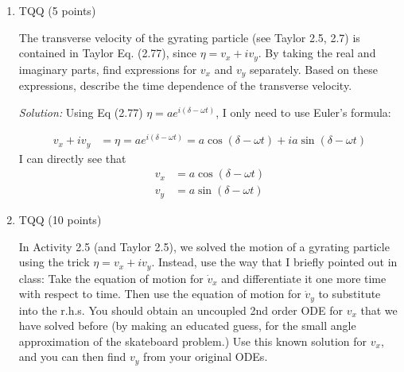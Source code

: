 \documentclass[12pt]{article}
\DeclareMathOperator{\sech}{sech}
\DeclareMathOperator{\arctanh}{arctanh}
\newcommand{\soln}[1] {\textit{Solution:} #1}
\begin{document}
\begin{enumerate}
\begin{enumerate}
                \soln{
                  $$1 - \tanh^2 z = 1 - \frac{\sinh^2 z}{\cosh^2 z} = \frac{\cosh^2 - \sinh^2}{\cosh^2} =\frac{1}{\cosh^z} = \sech^2 z$$
                }
          \item Show that $\int dx / (1-x^2) = \tanh^{-1} x$. ($\tanh^{-1}$ is also called $\arctanh$.)

                \soln{Again, I'm taking the derivative of the r.h.s. The derivative of the inverse of a function is one over the derivative of the function itself:

                  \begin{align*}
                    \frac{d}{dx}  \tanh^{-1} x & = \frac{1}{\tanh' (\tanh^{-1} x)} = \cosh^2  (\tanh^{-1} x) \\
                                               & = \frac{1}{1-\tanh^2 (\tanh^{-1} x)} = \frac{1}{1-x^2}
                  \end{align*}

                }

        \end{enumerate}


  \item TQQ (5 points)

        The transverse velocity of the gyrating particle (see Taylor 2.5, 2.7) is contained in Taylor Eq. (2.77), since $\eta = v_x + i v_y$. By taking the real and imaginary parts, find expressions for $v_x$ and $v_y$ separately. Based on these expressions, describe the time dependence of the transverse velocity.

        \soln{
          Using Eq (2.77) $\eta = a e^{i(\delta - \omega t)}$, I only need to use Euler's formula:

          \begin{align*}
            v_x + i v_y & = \eta = a e^{i(\delta - \omega t)} = a \cos (\delta - \omega t) + i a \sin(\delta - \omega t)
          \end{align*}
          I can directly see that
          \begin{align*}
            v_x & = a \cos (\delta - \omega t) \\
            v_y & = a \sin (\delta - \omega t)
          \end{align*}
        }


  \item TQQ (10 points)

        In Activity 2.5 (and Taylor 2.5), we solved the motion of a gyrating particle using the trick $\eta = v_x + i v_y$. Instead, use the way that I briefly pointed out in class: Take the equation of motion for $\dot v_x$ and differentiate it one more time with respect to time. Then use the equation of motion for $\dot v_y$ to substitute into the r.h.s. You should obtain an uncoupled 2nd order ODE for $v_x$ that we have solved before (by making an educated guess, for the small angle approximation of the skateboard problem.) Use this known solution for $v_x$, and you can then find $v_y$ from your original ODEs.


\end{enumerate}
\end{document}
